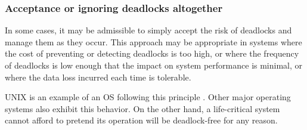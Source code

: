 \documentclass[../Thesis.tex]{subfiles}
\begin{document}
\subsubsection{Acceptance or ignoring deadlocks altogether}

In some cases, it may be admissible
to simply accept the risk of deadlocks and manage them as they occur.
This approach may be appropriate in systems where the cost of preventing
or detecting deadlocks is too high, or where the frequency of deadlocks is low enough
that the impact on system performance is minimal,
or where the data loss incurred each time is tolerable.

UNIX is an example of an OS following this principle \cite[p. 477]{shibu2016}.
Other major operating systems also exhibit this behavior.
On the other hand, a life-critical system cannot afford
to pretend its operation will be deadlock-free for any reason.
\end{document}
